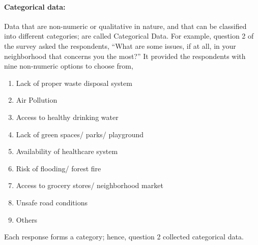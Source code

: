 \documentclass[a4paper, 11pt]{article}
\begin{document}
	\paragraph{Categorical data:}
	Data that are non-numeric or qualitative in nature, and that can be classified into different categories; are called Categorical Data. For example, question 2 of the survey asked the respondents, “What are some issues, if at all, in your neighborhood that concerns you the most?” It provided the respondents with nine non-numeric options to choose from, 
		\begin{enumerate}[label=(\alph*), noitemsep]
		\item 
		Lack of proper waste disposal system
		\item
		Air Pollution
		\item
		Access to healthy drinking water
		\item
		Lack of green spaces/ parks/ playground
		\item
		Availability of healthcare system
		\item
		Risk of flooding/ forest fire
		\item
		Access to grocery stores/ neighborhood market
		\item
		Unsafe road conditions
		\item
		Others
		\end{enumerate}
		
Each response forms a category; hence, question 2 collected categorical data. 
%
\end{document}
